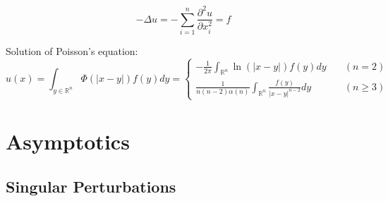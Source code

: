 \documentclass{article}
\begin{document}
\begin{definition}
    \begin{equation}
        \label{eq:poisson-equation}
        -\Delta u = -\sum_{i=1}^{n} \frac{\partial^{2} u}{\partial x_{i}^{2}} = f
    \end{equation}
\end{definition}

\begin{theorem}
    Solution of Poisson's equation:
    \begin{equation}
        \label{eq:poisson-equation-solution}
        u(x) = \int_{y \in \mathbb{R}^{n}} \Phi(|x-y|) f(y) dy =
        \begin{cases}
            -\frac{1}{2\pi} \int_{\mathbb{R}^{n}} \ln\left( |x-y| \right) f(y) dy \quad       & (n = 2)    \\
            \frac{1}{n(n-2)\alpha(n)} \int_{\mathbb{R}^{n}} \frac{f(y)}{|x-y|^{n-2}} dy \quad & (n \geq 3)
        \end{cases}
    \end{equation}
\end{theorem}

\section{Asymptotics}
\subsection{Singular Perturbations}

\printbibliography
\end{document}
